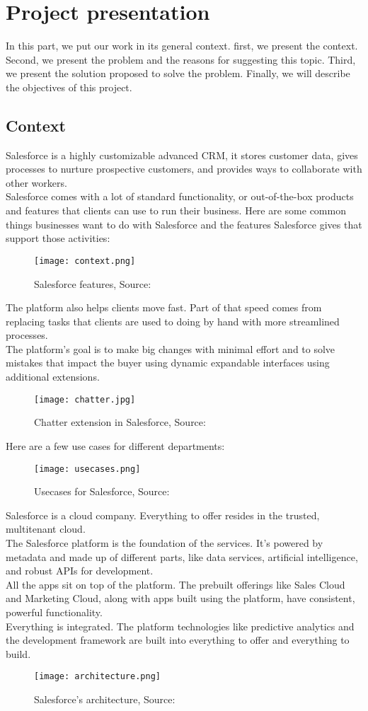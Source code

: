 \section{Project presentation}
In this part, we put our work in its general context.
first, we present the context. Second, we present the problem and the reasons for suggesting this topic. Third, we present the solution
proposed to solve the problem. Finally, we will describe the objectives
of this project.
\subsection{Context}
Salesforce is a highly customizable advanced CRM, it stores customer data, gives processes to nurture prospective customers, and provides ways to collaborate with other workers. \cite{1} \\
Salesforce comes with a lot of standard functionality, or out-of-the-box products and features that clients can use to run their business. Here are some common things businesses want to do with Salesforce and the features Salesforce gives that support those activities:\cite {1}
\begin{figure}[H]%
    \center   
    \texttt{[image: context.png]}
    \caption{Salesforce features, Source: \cite{1}}
\end{figure}
The platform also helps clients move fast. Part of that speed comes from replacing tasks that clients are used to doing by hand with more streamlined processes.\cite{2}\\
The platform's goal is to make big changes with minimal effort and to solve mistakes that impact the buyer using dynamic expandable interfaces using additional extensions.
\begin{figure}[H]%
    \center   
    \texttt{[image: chatter.jpg]}
    \caption{Chatter extension in Salesforce, Source: \cite{2}}
\end{figure}
\newpage
Here are a few use cases for different departments:
\begin{figure}[H]%
    \center   
    \texttt{[image: usecases.png]}
    \caption{Usecases for Salesforce, Source: \cite{2}}
\end{figure}
Salesforce is a cloud company. Everything to offer resides in the trusted, multitenant cloud.\\
The Salesforce platform is the foundation of the services. It’s powered by metadata and made up of different parts, like data services, artificial intelligence, and robust APIs for development.  \\
All the apps sit on top of the platform. The prebuilt offerings like Sales Cloud and Marketing Cloud, along with apps built using the platform, have consistent, powerful functionality.\\
Everything is integrated. The platform technologies like predictive analytics and the development framework are built into everything to offer and everything to build.\cite{3} 
\begin{figure}[H]%
    \center   
    \texttt{[image: architecture.png]}
    \caption{Salesforce's architecture, Source: \cite{3}}
\end{figure}

